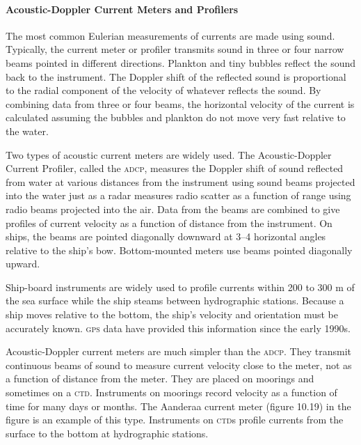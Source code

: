 \paragraph{Acoustic-Doppler Current Meters and Profilers}
The most common Eulerian measurements of currents are made using sound. Typically, the current meter or profiler transmits sound in three or four narrow beams pointed in different directions. Plankton and tiny bubbles reflect the sound back to the instrument. The Doppler shift of the reflected sound is proportional to the radial component of the velocity of whatever reflects the sound. By combining data from three or four beams, the horizontal velocity of the current is calculated assuming the bubbles and plankton do not move very fast relative to the water.

Two types of acoustic current meters are widely used. The Acoustic-Doppler Current Profiler, called the \textsc{adcp}, measures the Doppler shift of sound reflected from water at various distances from the instrument using sound beams projected into the water just as a radar measures radio scatter as a function of range using radio beams projected into the air. Data from the beams are combined to give profiles of current velocity as a function of distance from the instrument. On ships, the beams are pointed diagonally downward at 3--4 horizontal angles relative to the ship's bow. Bottom-mounted meters use beams pointed diagonally upward.

Ship-board instruments are widely used to profile currents within 200 to 300 m of the sea surface while the ship steams between hydrographic stations. Because a ship moves relative to the bottom, the ship's velocity and orientation must be accurately known. \textsc{gps} data have provided this information since the early 1990s.

Acoustic-Doppler current meters are much simpler than the \textsc{adcp}. They transmit continuous beams of sound to measure current velocity close to the meter, not as a function of distance from the meter. They are placed on moorings and sometimes on a \textsc{ctd}.  Instruments on moorings record velocity as a function of time for many days or months. The Aanderaa current meter (figure 10.19) in the figure is an example of this type. Instruments on \textsc{ctd}s profile currents from the surface to the bottom at hydrographic stations.

